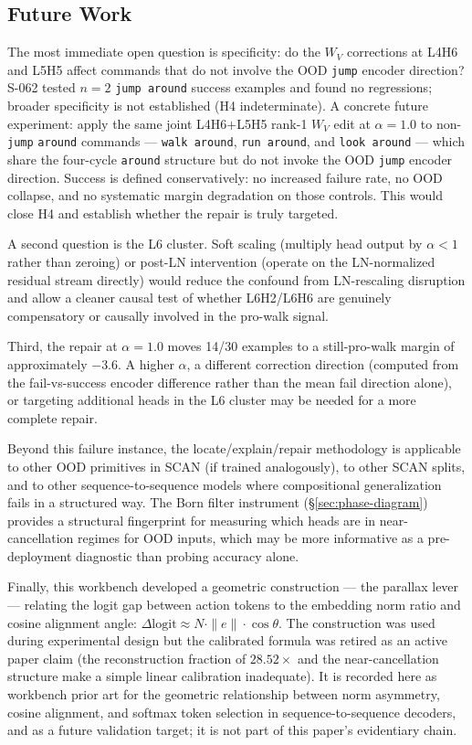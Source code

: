 \subsection{Future Work}

The most immediate open question is specificity: do the $W_V$ corrections at L4H6 and
L5H5 affect commands that do not involve the OOD \texttt{jump} encoder direction?
S-062 tested $n=2$ \texttt{jump around} success examples and found no regressions;
broader specificity is not established (H4 indeterminate).
A concrete future experiment: apply the same joint L4H6$+$L5H5 rank-1 $W_V$ edit at
$\alpha=1.0$ to non-\texttt{jump} \texttt{around} commands --- \texttt{walk around},
\texttt{run around}, and \texttt{look around} --- which share the four-cycle
\texttt{around} structure but do not invoke the OOD \texttt{jump} encoder direction.
Success is defined conservatively: no increased failure rate, no OOD collapse, and no
systematic margin degradation on those controls.
This would close H4 and establish whether the repair is truly targeted.

A second question is the L6 cluster.
Soft scaling (multiply head output by $\alpha < 1$ rather than zeroing) or post-LN
intervention (operate on the LN-normalized residual stream directly) would reduce the
confound from LN-rescaling disruption and allow a cleaner causal test of whether
L6H2/L6H6 are genuinely compensatory or causally involved in the pro-walk signal.

Third, the repair at $\alpha=1.0$ moves 14/30 examples to a still-pro-walk margin of
approximately $-3.6$.
A higher $\alpha$, a different correction direction (computed from the fail-vs-success
encoder difference rather than the mean fail direction alone), or targeting additional
heads in the L6 cluster may be needed for a more complete repair.

Beyond this failure instance, the locate/explain/repair methodology is applicable to
other OOD primitives in SCAN (if trained analogously), to other SCAN splits, and to
other sequence-to-sequence models where compositional generalization fails in a
structured way.
The Born filter instrument (\S\ref{sec:phase-diagram}) provides a structural fingerprint
for measuring which heads are in near-cancellation regimes for OOD inputs, which may
be more informative as a pre-deployment diagnostic than probing accuracy alone.

Finally, this workbench developed a geometric construction --- the parallax lever ---
relating the logit gap between action tokens to the embedding norm ratio and cosine
alignment angle: $\Delta\text{logit} \approx N \cdot \|e\| \cdot \cos\theta$.
The construction was used during experimental design but the calibrated formula was
retired as an active paper claim (the reconstruction fraction of $28.52\times$ and the
near-cancellation structure make a simple linear calibration inadequate).
It is recorded here as workbench prior art for the geometric relationship between norm
asymmetry, cosine alignment, and softmax token selection in sequence-to-sequence decoders,
and as a future validation target; it is not part of this paper's evidentiary chain.
